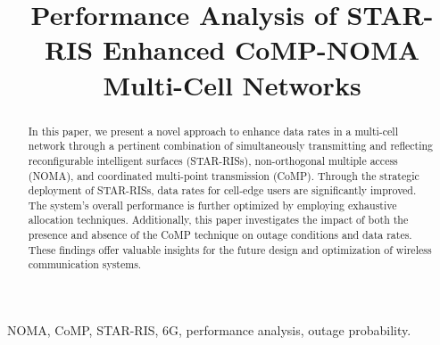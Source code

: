 \documentclass[conference]{IEEEtran}
\begin{document}
\title{Performance Analysis of STAR-RIS Enhanced CoMP-NOMA Multi-Cell Networks}

\author{
}
\maketitle

\begin{abstract}
    In this paper, we present a novel approach to enhance data rates in a multi-cell network through a pertinent combination of simultaneously transmitting and reflecting reconfigurable intelligent surfaces (STAR-RISs), non-orthogonal multiple access (NOMA), and coordinated multi-point transmission (CoMP). Through the strategic deployment of STAR-RISs, data rates for cell-edge users are significantly improved. The system's overall performance is further optimized by employing exhaustive allocation techniques. Additionally, this paper investigates the impact of both the presence and absence of the CoMP technique on outage conditions and data rates. These findings offer valuable insights for the future design and optimization of wireless communication systems.
\end{abstract}

\begin{IEEEkeywords}
    NOMA, CoMP, STAR-RIS, 6G, performance analysis, outage probability.
\end{IEEEkeywords}
\end{document}
